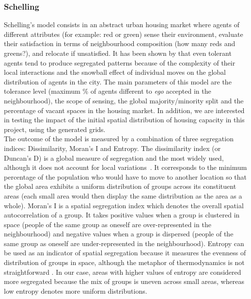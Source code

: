\documentclass{JASSS}
\begin{document}
\subsubsection{Schelling}
Schelling's model consists in an abstract urban housing market where agents of different attributes (for example: red or green) sense their environment, evaluate their satisfaction in terms of neighbourhood composition (how many reds and greens?), and relocate if unsatisfied. It has been shown by \cite{Schelling1969} that even tolerant agents tend to produce segregated patterns because of the complexity of their local interactions and the snowball effect of individual moves on the global distribution of agents in the city. The main parameters of this model are the tolerance level (maximum \% of agents different to {\it ego} accepted in the neighbourhood), the scope of sensing, the global majority/minority split and the percentage of vacant spaces in the housing market. In addition, we are interested in testing the impact of the initial spatial distribution of housing capacity in this project, using the generated grids. \\
The outcome of the model is measured by a combination of three segregation indices: Dissimilarity, Moran's I and Entropy. The dissimilarity index (or Duncan's D) is a global measure of segregation and the most widely used, although it does not account for local variations~\citep{white1986segregation, brown2006spatial}. It corresponds to the minimum percentage of the population who would have to move to another location so that the global area exhibits a uniform distribution of groups across its constituent areas (each small area would then display the same distribution as the area as a whole). Moran's I is a spatial segregation index which denotes the overall spatial autocorrelation of a group. It takes positive values when a group is clustered in space (people of the same group as oneself are over-represented in the neighbourhood) and negative values when a group is dispersed (people of the same group as oneself are under-represented in the neighbourhood). Entropy can be used as an indicator of spatial segregation because it measures the evenness of distribution of groups in space, although the metaphor of thermodynamics is not straightforward \citep{barner2017multiscale}. In our case, areas with higher values of entropy are considered more segregated because the mix of groups is uneven across small areas, whereas low entropy denotes more uniform distributions.\\
\end{document}
